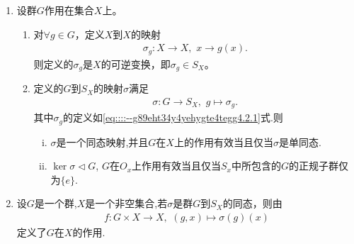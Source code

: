 \documentclass[../../main.tex]{subfiles}%
\begin{document}
\begin{theorem}\label{theorem:抽象代数--定理4.2.1}
\begin{enumerate}
\item 设群$G$作用在集合$X$上。
\begin{enumerate}[(1)]
\item\label{theorem:抽象代数--定理4.2.1-1} 对$\forall g \in G$，定义$X$到$X$的映射
\begin{align}
\sigma _g:X\rightarrow X,\,\,x\rightarrow g\left( x \right) . \label{eq::::--g89eht34y4yehygte4tegg4.2.1}
\end{align}
则定义的$\sigma_g$是$X$的可逆变换，即$\sigma_g \in S_X$。

\item\label{theorem:抽象代数--定理4.2.1-2} 定义的$G$到$S_X$的映射$\sigma$满足
\begin{align*}
\sigma :G\rightarrow S_X,\,\,g\mapsto \sigma _g.
\end{align*}
其中$\sigma_g$的定义如\eqref{eq::::--g89eht34y4yehygte4tegg4.2.1}式.则
\begin{enumerate}[(i)]
\item\label{theorem:抽象代数--定理4.2.1-2-1} $\sigma$是一个同态映射,并且$G$在$X$上的作用有效当且仅当$\sigma$是单同态.

\item\label{theorem:抽象代数--定理4.2.1-2-2} 
$\ker \sigma\lhd G$,
$G$在$O_x$上作用有效当且仅当$S_x$中所包含的$G$的正规子群仅为$\{e\}$.
\end{enumerate}
\end{enumerate}

\item 设$G$是一个群,$X$是一个非空集合,若$\sigma$是群$G$到$S_X$的同态，则由
\begin{align}
f:G\times X\rightarrow X,\,\,\left( g,x \right) \mapsto \sigma \left( g \right) \left( x \right) \label{eq::::--g89eht34y4yehygte4tegg4.2.2}
\end{align}
定义了$G$在$X$的作用.
\end{enumerate}
\end{theorem}
\end{document}
